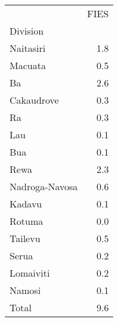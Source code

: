\begin{tabular}{lr}
\toprule
{} &  FIES \\
Division       &       \\
\midrule
Naitasiri      &   1.8 \\
Macuata        &   0.5 \\
Ba             &   2.6 \\
Cakaudrove     &   0.3 \\
Ra             &   0.3 \\
Lau            &   0.1 \\
Bua            &   0.1 \\
Rewa           &   2.3 \\
Nadroga-Navosa &   0.6 \\
Kadavu         &   0.1 \\
Rotuma         &   0.0 \\
Tailevu        &   0.5 \\
Serua          &   0.2 \\
Lomaiviti      &   0.2 \\
Namosi         &   0.1 \\
Total          &   9.6 \\
\bottomrule
\end{tabular}
